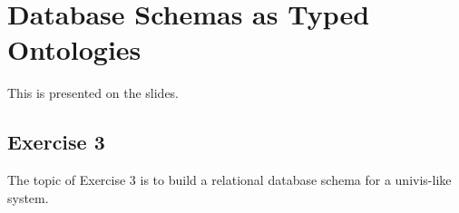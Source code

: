 \section{Database Schemas as Typed Ontologies}

This is presented on the slides.

\subsection{Exercise 3}

The topic of Exercise 3 is to build a relational database schema for a univis-like system.

%


